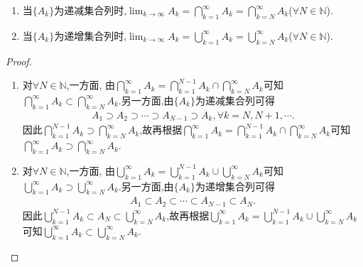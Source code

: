 \documentclass[../../main.tex]{subfiles}
\begin{document}
\begin{proposition}\label{proposition:单调集合上下限的一般形式}
\begin{enumerate}
\item 当$\{A_k\}$为递减集合列时,$\lim_{k\to \infty}A_k=\bigcap_{k=1}^{\infty}A_k=\bigcap_{k=N}^{\infty}A_k$($\forall N\in \mathbb{N}$).

\item 当$\{A_k\}$为递增集合列时,$\lim_{k\to \infty}A_k=\bigcup_{k=1}^{\infty}A_k=\bigcup_{k=N}^{\infty}A_k$($\forall N\in \mathbb{N}$).
\end{enumerate}

\end{proposition}
\begin{proof}
\begin{enumerate}
\item 对$\forall N\in \mathbb{N}$,一方面,
由$\bigcap_{k=1}^{\infty}{A_k}=\bigcap_{k=1}^{N-1}{A_k}\cap \bigcap_{k=N}^{\infty}{A_k}$可知$\bigcap_{k=1}^{\infty}{A_k}\subset \bigcap_{k=N}^{\infty}{A_k}$.另一方面,由$\{A_k\}$为递减集合列可得
\begin{align*}
A_1\supset A_2\supset \cdots \supset A_{N-1}\supset A_k,\forall k=N,N+1,\cdots .
\end{align*}
因此$\bigcap_{k=1}^{N-1}{A_k}\supset \bigcap_{k=N}^{\infty}{A_k}$,故再根据$\bigcap_{k=1}^{\infty}{A_k}=\bigcap_{k=1}^{N-1}{A_k}\cap \bigcap_{k=N}^{\infty}{A_k}$可知$\bigcap_{k=1}^{\infty}{A_k}\supset \bigcap_{k=N}^{\infty}{A_k}$.

\item 对$\forall N\in \mathbb{N}$,一方面,
由$\bigcup_{k=1}^{\infty}{A_k}=\bigcup_{k=1}^{N-1}{A_k}\cup \bigcup_{k=N}^{\infty}{A_k}$可知$\bigcup_{k=1}^{\infty}{A_k}\supset \bigcup_{k=N}^{\infty}{A_k}$.另一方面,由$\{A_k\}$为递增集合列可得
\begin{align*}
A_1\subset A_2\subset \cdots \subset A_{N-1}\subset A_N.
\end{align*}
因此$\bigcup_{k=1}^{N-1}{A_k}\subset A_N \subset \bigcup_{k=N}^{\infty}{A_k}$,故再根据$\bigcup_{k=1}^{\infty}{A_k}=\bigcup_{k=1}^{N-1}{A_k}\cup \bigcup_{k=N}^{\infty}{A_k}$可知$\bigcup_{k=1}^{\infty}{A_k}\subset \bigcup_{k=N}^{\infty}{A_k}$.
\end{enumerate}
\end{proof}
\end{document}
